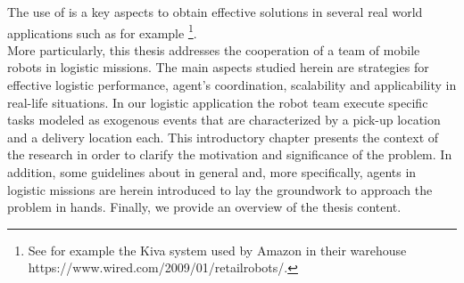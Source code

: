 The use of \mrs is a key aspects to obtain effective solutions in several real world
applications such as for example \footnote{See for example the Kiva system used by Amazon in their warehouse https://www.wired.com/2009/01/retailrobots/.}.
\\
More particularly,
this thesis addresses the cooperation of a team of mobile robots in logistic missions.
The main aspects studied herein are strategies for effective logistic performance,
agent's coordination, scalability and applicability in real-life situations.
In our logistic application the robot team execute specific tasks modeled as exogenous events 
that are characterized by a pick-up location and a delivery location each.
\newline
This introductory chapter presents the context of the research in order to clarify
the motivation and significance of the problem. 
In addition, some guidelines about \mrs in general and, more specifically,
agents in logistic missions are herein introduced to lay the groundwork to 
approach the problem in hands. 
Finally, we provide an overview of the thesis content. 

